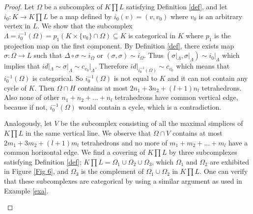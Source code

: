 \documentclass[preprint,11pt %
]{hjm1}
\theoremstyle{definition}
\begin{document}
\begin{proof}
Let $\Omega$ be a subcomplex of $K \prod L$ satisfying Definition \ref{def}, and let $i_0:K\to K \prod L$ be a map defined by $i_0 (v)=(v,v_0)$ where $v_0$ is an arbitrary vertex in $L$. We show that the subcomplex 
\(
\Lambda= i_0 ^{-1}(\Omega )=p _1 (K\times \lbrace v_0\rbrace \cap \Omega )\subseteq K
\)
is categorical in $K$ where $p_1$ is the projection map on the first component. By Definition \ref{def}, there exists map $\sigma :\Omega \to L$ such that $\Delta \circ \sigma \sim i_{\Omega}$ or $(\sigma ,\sigma )\sim i_{\Omega}$. Thus 
$(\sigma|_{\Lambda}, \sigma|_{\Lambda})\sim i_0|_{\Lambda}$ which implies that $id|_{\Lambda} \sim \sigma|_{\Lambda} \sim c_{v_0}|_{\Lambda}$. Therefore $id|_{i_0^{-1}(\Omega)}\sim c_{v_0}$ which means that ${i_0^{-1}(\Omega)}$ is categorical.
So $i_0 ^{-1}(\Omega)$ is not equal to $K$ and it can not contain any cycle of $K$. Then $\Omega \cap H$ contains at most $2n_1+3n_2+(l+1)n_l$ tetrahedrons. Also none of other $n_1+n_2+...+n_l$ tetrahedrons have common vertical edge, because if not,  $i_0^{-1}(\Omega)$ would contain a cycle, which is a contradiction.

Analogously, let $V$ be the subcomplex consisting of all the maximal simplices of $K \prod L$ in the same vertical line. We observe that $\Omega \cap V$ contains at most $2m_1+3m_2+(l+1)m_l$ tetrahedrons and no more of $m_1+m_2+...+m_l$ have a common horizontal edge. We find a covering of $K \prod L$ by three subcomplexes satisfying Definition \ref{def}; $K \prod L=\Omega _1 \cup \Omega _2 \cup \Omega _3$, which $\Omega _1$ and $\Omega _2$ are exhibited in Figure \ref{Fig 6}, and $\Omega _3$ is the complement of $\Omega _1 \cup \Omega _2$ in $K \prod L$. One can verify that these subcomplexes are categorical by using a similar argument as used in Example \ref{exa}.

\begin{figure}[!ht]
\centering
{}
\end{figure}
\end{proof}
\end{document}
